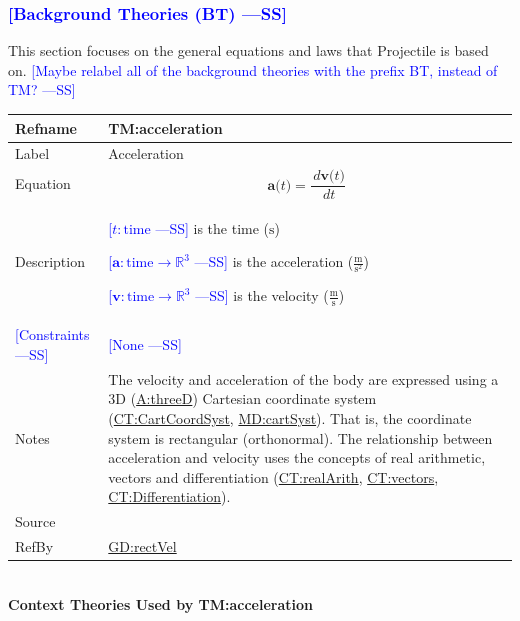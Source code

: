 \documentclass[12pt]{article}
\newcommand{\authornote}[3]{\textcolor{#1}{[#3 ---#2]}}
\newcommand{\authornote}[3]{}
\newcommand{\wss}[1]{\authornote{blue}{SS}{#1}}
\begin{document}
\subsubsection{\wss{Background Theories (BT)}}
\label{Sec:TMs}
This section focuses on the general equations and laws that Projectile is based
on.  \wss{Maybe relabel all of the background theories with the prefix BT,
instead of TM?}

\medskip
\noindent
\begin{minipage}{\textwidth}
\begin{tabular}{>{\raggedright}p{}>{\raggedright\arraybackslash}p{}}
\toprule \textbf{Refname} & \textbf{TM:acceleration}
\label{TM:acceleration}
\\ \midrule
Label & Acceleration
\\ \midrule
Equation & \begin{displaymath}
           \symbf{a}\text{(}t\text{)}=\frac{\,d\symbf{v}\text{(}t\text{)}}{\,dt}
           \end{displaymath}
\\ \midrule
Description & \begin{symbDescription}
              \item{\wss{$t: \text{time}$} is the time (${\text{s}}$)}
              \item{\wss{$\symbf{a}: \text{time} \rightarrow \mathbb{R}^3$} is the acceleration ($\frac{\text{m}}{\text{s}^{2}}$)}
              \item{\wss{$\symbf{v}: \text{time} \rightarrow \mathbb{R}^3$} is the velocity ($\frac{\text{m}}{\text{s}}$)}
              \end{symbDescription}
\\ \midrule
\wss{Constraints} & \wss{None}

\\ \midrule
Notes & The velocity and acceleration of the body are expressed using a 3D
(\hyperref[threeD]{A:threeD}) Cartesian coordinate system
(\hyperref[CT:CartCoordSyst]{CT:CartCoordSyst},
\hyperref[MD:cartSyst]{MD:cartSyst}).  That is, the coordinate system is
rectangular (orthonormal). The relationship between acceleration and velocity
uses the concepts of real arithmetic, vectors and differentiation
(\hyperref[CT:realArith]{CT:realArith}, \hyperref[CT:vectors]{CT:vectors},
\hyperref[CT:Differentiation]{CT:Differentiation}).

\\ \midrule
Source & \cite{accelerationWiki}
         
\\ \midrule
RefBy & \hyperref[GD:rectVel]{GD:rectVel}
        
\\ \bottomrule
\end{tabular}
\end{minipage}
~\\
\noindent \textbf{Context Theories Used by TM:acceleration}
\end{document}
